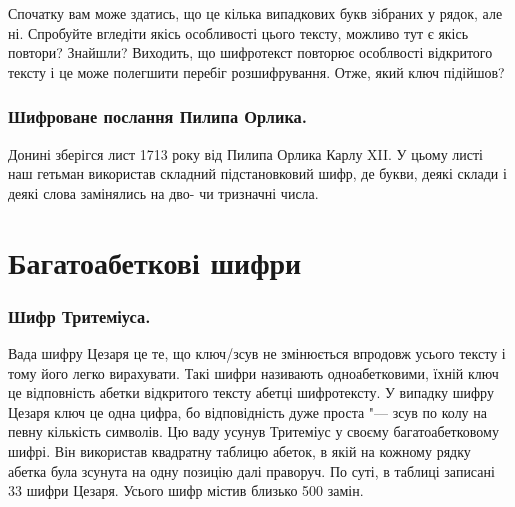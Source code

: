 \documentclass{book}
\begin{document}
Спочатку вам може здатись, що це кілька випадкових букв зібраних у рядок, але ні.
Спробуйте вгледіти якісь особливості цього тексту, можливо тут є якісь повтори?
Знайшли? Виходить, що шифротекст повторює особлвості відкритого тексту і це може
полегшити перебіг розшифрування. Отже, який ключ підійшов?

\subsection*{Шифроване послання Пилипа Орлика.}
Донині зберігся лист 1713 року від Пилипа Орлика Карлу XII. У цьому листі наш
гетьман використав складний підстановковий шифр, де букви, деякі склади і деякі
слова замінялись на дво- чи тризначні числа.


\chapter*{Багатоабеткові шифри}

\subsection*{Шифр Тритеміуса.}

Вада шифру Цезаря це те, що ключ/зсув не змінюється впродовж усього тексту і
тому його легко вирахувати. Такі шифри називають одноабетковими, їхній ключ це
відповність абетки відкритого тексту абетці шифротексту. У випадку шифру Цезаря
ключ це одна цифра, бо відповідність дуже проста "--- зсув по колу на певну
кількість символів. Цю ваду усунув Тритеміус у своєму багатоабетковому шифрі.
Він використав квадратну таблицю абеток, в якій на кожному рядку абетка була
зсунута на одну позицію далі праворуч. По суті, в таблиці записані 33 шифри
Цезаря. Усього шифр містив близько 500 замін.
\end{document}

